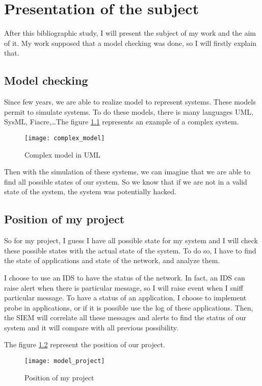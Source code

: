 
\chapter{Presentation of the subject}

After this bibliographic study, I will present the subject of my work and the aim of it. My work supposed that a
model checking was done, so I will firstly explain that.

\section{Model checking}

Since few years, we are able to realize model to represent systems. These models permit to simulate systems. To do
these models, there is many languages UML, SysML, Fiacre,\dots The figure \ref{fig:model} represents an example of
a complex system.

\begin{figure}[h]
  \centering
  \texttt{[image: complex\_model]}
  \caption{Complex model in UML}
  \label{fig:model}
\end{figure}


Then with the simulation of these systems, we can imagine that we are able to find all possible states of our
system. So we know that if we are not in a valid state of the system, the system was potentially hacked.

\section{Position of my project}

So for my project, I guess I have all possible state for my system and I will check these possible states with the
actual state of the system. To do so, I have to find the state of applications and state of the network, and
analyze them.

I choose to use an IDS to have the status of the network. In fact, an IDS can raise alert when there is particular
message, so I will raise event when I sniff particular message. To have a status of an application, I choose to
implement probe in applications, or if it is possible use the log of these applications. Then, the SIEM will
correlate all these messages and alerts to find the status of our system and it will compare with all previous
possibility.


The figure \ref{fig:model_project} represent the position of our project.

\begin{figure}[h]
  \centering
  \texttt{[image: model\_project]}
  \caption{Position of my project}
  \label{fig:model_project}
\end{figure}




